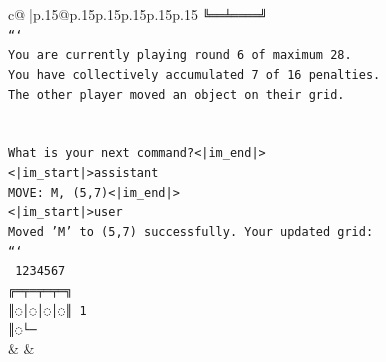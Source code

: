 \documentclass{article}
\begin{document}
{\begin{supertabular}{c@{$\;$}|p{.15\linewidth}@{}p{.15\linewidth}p{.15\linewidth}p{.15\linewidth}p{.15\linewidth}p{.15\linewidth}}
{{{\texttt{╚══╧════╝} \\
\texttt{```} \\
\texttt{You are currently playing round 6 of maximum 28.} \\
\texttt{You have collectively accumulated 7 of 16 penalties.} \\
\texttt{The other player moved an object on their grid.} \\
\\ 
\\ 
\texttt{What is your next command?<|im\_end|>} \\
\texttt{<|im\_start|>assistant} \\
\texttt{MOVE: M, (5,7)<|im\_end|>} \\
\texttt{<|im\_start|>user} \\
\texttt{Moved 'M' to (5,7) successfully. Your updated grid:} \\
\texttt{```} \\
\texttt{ 1234567} \\
\texttt{╔═╤═╤═╤═╗} \\
\texttt{║◌│◌│◌│◌║ 1} \\
\texttt{║◌└─} \\
            }
        }
    }
    & & \\ \\


\end{supertabular}}
\end{document}
